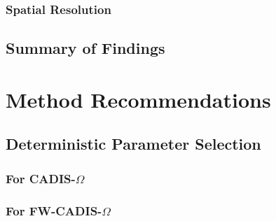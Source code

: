 \subsubsection{Spatial Resolution}
\subsection{Summary of Findings}
\section{Method Recommendations}
\subsection{Deterministic Parameter Selection}
\subsubsection{For CADIS-$\Omega$}
\subsubsection{For FW-CADIS-$\Omega$}




